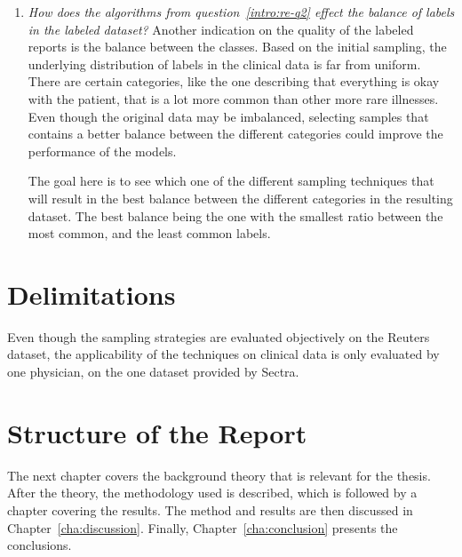 \begin{enumerate}
  \item \label{intro:re-q3}
      \textit{How does the algorithms from question~\ref{intro:re-q2} effect the balance of labels in the labeled dataset?}
      Another indication on the quality of the labeled reports is the balance between the classes.
      Based on the initial sampling, the underlying distribution of labels in the clinical data is far from uniform.
      There are certain categories, like the one describing that everything is okay with the patient, that is a lot more common than other more rare illnesses.
      Even though the original data may be imbalanced, selecting samples that contains a better balance between the different categories could improve the performance of the models.

      The goal here is to see which one of the different sampling techniques that will result in the best balance between the different categories in the resulting dataset.
      The best balance being the one with the smallest ratio between the most common, and the least common labels.
\end{enumerate}

\section{Delimitations}
\label{sec:delimitations}

Even though the sampling strategies are evaluated objectively on the Reuters dataset, the applicability of the techniques on clinical data is only evaluated by one physician, on the one dataset provided by Sectra.

\section{Structure of the Report}
\label{sec:structure}

The next chapter covers the background theory that is relevant for the thesis.
After the theory, the methodology used is described, which is followed by a chapter covering the results.
The method and results are then discussed in Chapter~\ref{cha:discussion}.
Finally, Chapter~\ref{cha:conclusion} presents the conclusions.
